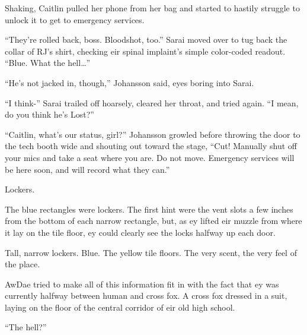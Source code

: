 Shaking, Caitlin pulled her phone from her bag and started to hastily struggle to unlock it to get to emergency services.

``They're rolled back, boss.  Bloodshot, too.''  Sarai moved over to tug back the collar of RJ's shirt, checking eir spinal implaint's simple color-coded readout.  ``Blue.  What the hell\ldots{}''

``He's not jacked in, though,'' Johansson said, eyes boring into Sarai.

``I think-'' Sarai trailed off hoarsely, cleared her throat, and tried again.  ``I mean, do you think he's Lost?''

``Caitlin, what's our status, girl?''  Johansson growled before throwing the door to the tech booth wide and shouting out toward the stage, ``Cut!  Manually shut off your mics and take a seat where you are.  Do not move.  Emergency services will be here soon, and will record what they can.''

\secdiv

Lockers.

The blue rectangles were lockers.  The first hint were the vent slots a few inches from the bottom of each narrow rectangle, but, as ey lifted eir muzzle from where it lay on the tile floor, ey could clearly see the locks halfway up each door.

Tall, narrow lockers.  Blue.  The yellow tile floors.  The very scent, the very feel of the place.

AwDae tried to make all of this information fit in with the fact that ey was currently halfway between human and cross fox.  A cross fox dressed in a suit, laying on the floor of the central corridor of eir old high school.

``The hell?''
